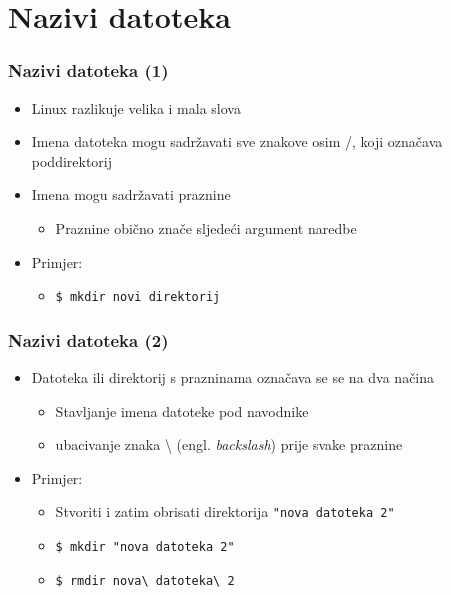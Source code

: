 \documentclass{beamer}
\begin{document}
\section{Nazivi datoteka}
\begin{frame}[t]
\frametitle{Nazivi datoteka (1)}
\begin{itemize}
  \item Linux razlikuje velika i mala slova
  \item Imena datoteka mogu sadržavati sve znakove osim /, koji označava
        poddirektorij
  \item Imena mogu sadržavati praznine
  \begin{itemize}
    \item Praznine obično znače sljedeći argument naredbe 
  \end{itemize}
  \item Primjer:
  \begin{itemize}
    \item[] \texttt{\$ mkdir novi direktorij}
  \end{itemize}
\end{itemize}
\end{frame}

\begin{frame}[t]
\frametitle{Nazivi datoteka (2)}
\begin{itemize}
  \item Datoteka ili direktorij s prazninama označava se se na dva načina 
  \begin{itemize}
    \item Stavljanje imena datoteke pod navodnike
    \item ubacivanje znaka \textbackslash{} (engl. \emph{backslash}) 
          prije svake praznine
  \end{itemize}
  \item Primjer:
  \begin{itemize}
    \item[] Stvoriti i zatim obrisati direktorija \texttt{"nova
            datoteka 2"}
    \item[] \texttt{\$ mkdir "nova datoteka 2"}
    \item[] \texttt{\$ rmdir nova\textbackslash{} datoteka\textbackslash{}
                     2}
  \end{itemize}
\end{itemize}
\end{frame}
\end{document}
